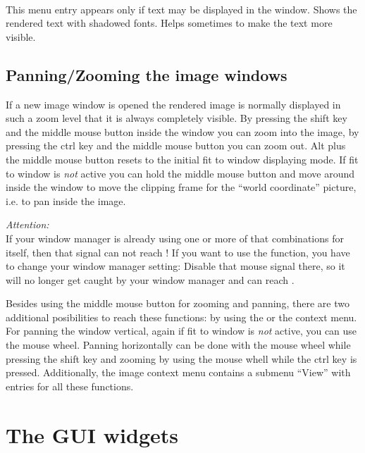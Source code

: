 \paragraph{}
This menu entry appears only if text may be displayed in the window.
Shows the rendered text with shadowed fonts. Helps sometimes to make
the text more visible.

\subsection{Panning/Zooming the image windows}
\label{sub:panZoom}

If a new image window is opened the rendered image is normally
displayed in such a zoom level that it is always completely
visible. By pressing the shift key and the middle mouse button
inside the window you can zoom into the image, by pressing the ctrl
key and the middle mouse button you can zoom out. Alt plus the
middle mouse button resets to the initial fit to window displaying
mode. If fit to window is \emph{not} active you can hold the middle
mouse button and move around inside the window to move the clipping
frame for the ``world coordinate'' picture, i.e. to pan inside the
image.

\emph{Attention:}\\
If your window manager is already using one or more of that
combinations for itself, then that signal can not reach \icewing{}!
If you want to use the function, you have to change your window
manager setting: Disable that mouse signal there, so it will no
longer get caught by your window manager and can reach \icewing{}.

Besides using the middle mouse button for zooming and panning, there
are two additional posibilities to reach these functions: by using
the  or the context menu. For panning the window
vertical, again if fit to window is \emph{not} active, you can use
the mouse wheel. Panning horizontally can be done with the mouse
wheel while pressing the shift key and zooming by using the mouse
whell while the ctrl key is pressed. Additionally, the image context
menu contains a submenu ``View'' with entries for all these
functions.


\section{The GUI widgets}

